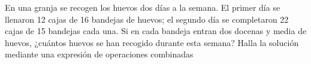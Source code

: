 \documentclass[addpoints,spanish, 12pt,a4paper]{exam}
\renewcommand*\half{.5}
\begin{document}
\begin{questions}
\question[2] En una granja se recogen los huevos dos días a la
  semana. El primer día se llenaron 12 cajas de 16 bandejas de huevos;
  el segundo día se completaron 22 cajas de 15 bandejas cada una. Si en
  cada bandeja entran dos docenas y media de huevos, ¿cuántos huevos se
  han recogido durante esta semana? Halla la solución mediante una
  expresión de operaciones combinadas





    
    

\end{questions}
\end{document}
